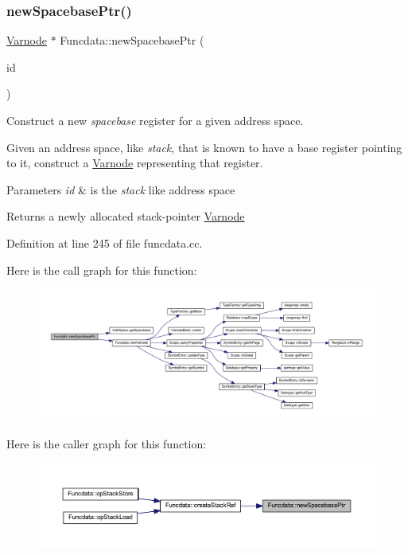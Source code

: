 \subsubsection{\texorpdfstring{newSpacebasePtr()}{newSpacebasePtr()}}
{\footnotesize\ttfamily \mbox{\hyperlink{class_varnode}{Varnode}} $\ast$ Funcdata\+::new\+Spacebase\+Ptr (\begin{DoxyParamCaption}\item[{\mbox{\hyperlink{class_addr_space}{Addr\+Space}} $\ast$}]{id }\end{DoxyParamCaption})}



Construct a new {\itshape spacebase} register for a given address space. 

Given an address space, like {\itshape stack}, that is known to have a base register pointing to it, construct a \mbox{\hyperlink{class_varnode}{Varnode}} representing that register. 
\begin{DoxyParams}{Parameters}
{\em id} & is the {\itshape stack} like address space \\
\hline
\end{DoxyParams}
\begin{DoxyReturn}{Returns}
a newly allocated stack-\/pointer \mbox{\hyperlink{class_varnode}{Varnode}} 
\end{DoxyReturn}


Definition at line 245 of file funcdata.\+cc.

Here is the call graph for this function\+:
\nopagebreak
\begin{figure}[H]
\begin{center}
\leavevmode
\includegraphics[width=350pt]{class_funcdata_ac083b7d6637a5883ef8cbd38e7756837_cgraph}
\end{center}
\end{figure}
Here is the caller graph for this function\+:
\nopagebreak
\begin{figure}[H]
\begin{center}
\leavevmode
\includegraphics[width=350pt]{class_funcdata_ac083b7d6637a5883ef8cbd38e7756837_icgraph}
\end{center}
\end{figure}
\mbox{\label{class_funcdata_a731f6fd415269577b7bb1943315b8a76}} 
